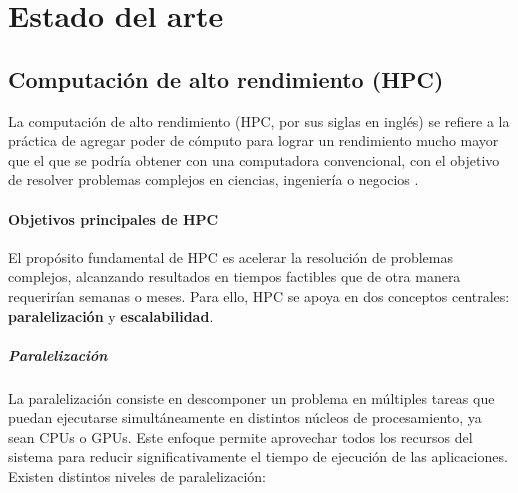 \chapter{Estado del arte}\label{cap:estado_del_arte}



\section{Computación de alto rendimiento (\acs{HPC})}\label{sec:computacion_alto_rendimiento}

La computación de alto rendimiento (\acs{HPC}, por sus siglas en inglés) se refiere a la práctica de agregar poder de cómputo para lograr un rendimiento mucho mayor que el que se podría obtener con una computadora convencional, con el objetivo de resolver problemas complejos en ciencias, ingeniería o negocios \cite{sravanthi2014hpc}.

\subsubsection{Objetivos principales de HPC}

El propósito fundamental de HPC es acelerar la resolución de problemas complejos, alcanzando resultados en tiempos factibles que de otra manera requerirían semanas o meses. Para ello, HPC se apoya en dos conceptos centrales: \textbf{paralelización} y \textbf{escalabilidad}.

\paragraph{Paralelización}
La paralelización consiste en descomponer un problema en múltiples tareas que puedan ejecutarse simultáneamente en distintos núcleos de procesamiento, ya sean CPUs o GPUs. Este enfoque permite aprovechar todos los recursos del sistema para reducir significativamente el tiempo de ejecución de las aplicaciones. Existen distintos niveles de paralelización:

